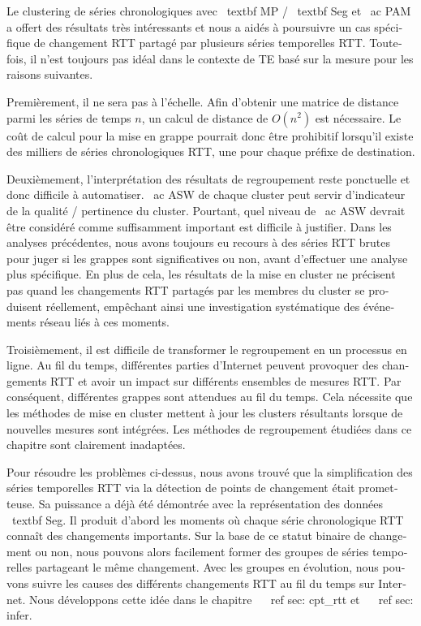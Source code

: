 \begin{otherlanguage}{french}
{Le clustering de séries chronologiques avec \ textbf {MP} / \ textbf {Seg} et \ ac {PAM} a offert des résultats très intéressants et nous a aidés à poursuivre un cas spécifique de changement RTT partagé par plusieurs séries temporelles RTT.
Toutefois, il n'est toujours pas idéal dans le contexte de TE basé sur la mesure pour les raisons suivantes.

Premièrement, il ne sera pas à l'échelle. Afin d'obtenir une matrice de distance parmi les séries de temps $ n $, un calcul de distance de $ O (n ^ 2) $ est nécessaire. Le coût de calcul pour la mise en grappe pourrait donc être prohibitif lorsqu'il existe des milliers de séries chronologiques RTT, une pour chaque préfixe de destination.

Deuxièmement, l'interprétation des résultats de regroupement reste ponctuelle et donc difficile à automatiser.
\ ac {ASW} de chaque cluster peut servir d'indicateur de la qualité / pertinence du cluster.
Pourtant, quel niveau de \ ac {ASW} devrait être considéré comme suffisamment important est difficile à justifier.
Dans les analyses précédentes, nous avons toujours eu recours à des séries RTT brutes pour juger si les grappes sont significatives ou non, avant d'effectuer une analyse plus spécifique.
En plus de cela, les résultats de la mise en cluster ne précisent pas quand les changements RTT partagés par les membres du cluster se produisent réellement, empêchant ainsi une investigation systématique des événements réseau liés à ces moments.

Troisièmement, il est difficile de transformer le regroupement en un processus en ligne.
Au fil du temps, différentes parties d'Internet peuvent provoquer des changements RTT et avoir un impact sur différents ensembles de mesures RTT.
Par conséquent, différentes grappes sont attendues au fil du temps.
Cela nécessite que les méthodes de mise en cluster mettent à jour les clusters résultants lorsque de nouvelles mesures sont intégrées.
Les méthodes de regroupement étudiées dans ce chapitre sont clairement inadaptées.

Pour résoudre les problèmes ci-dessus, nous avons trouvé que la simplification des séries temporelles RTT via la détection de points de changement était prometteuse.
Sa puissance a déjà été démontrée avec la représentation des données \ textbf {Seg}.
Il produit d'abord les moments où chaque série chronologique RTT connaît des changements importants.
Sur la base de ce statut binaire de changement ou non, nous pouvons alors facilement former des groupes de séries temporelles partageant le même changement.
Avec les groupes en évolution, nous pouvons suivre les causes des différents changements RTT au fil du temps sur Internet.
Nous développons cette idée dans le chapitre ~ \ ref {sec: cpt_rtt} et ~ \ ref {sec: infer}.

}
\end{otherlanguage}
